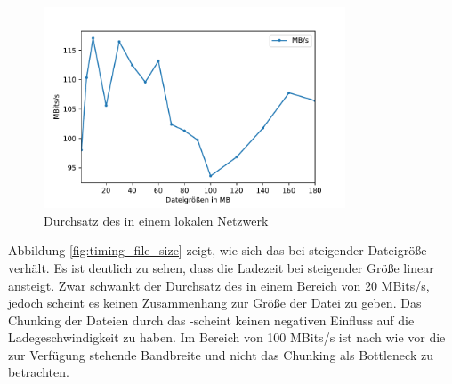 \begin{figure}[!h]
	\centering
	\includegraphics[width=0.8\textwidth]{figures/durchsatz_file_size}
	\caption[A Figure Short-Title]{Durchsatz des \ptp \cdns in einem lokalen Netzwerk}
	\label{fig:durchsatz_file_size}
\end{figure}

Abbildung \ref{fig:timing_file_size} zeigt, wie sich das \cdn bei steigender Dateigröße verhält. Es ist deutlich zu sehen, dass die Ladezeit bei steigender Größe linear ansteigt. Zwar schwankt der Durchsatz des \cdns in einem Bereich von 20 MBits/s, jedoch scheint es keinen Zusammenhang zur Größe der Datei zu geben. Das Chunking der Dateien durch das \pTp-\cdn scheint keinen negativen Einfluss auf die Ladegeschwindigkeit zu haben. Im Bereich von 100 MBits/s ist nach wie vor die zur Verfügung stehende Bandbreite und nicht das Chunking als Bottleneck zu betrachten.




